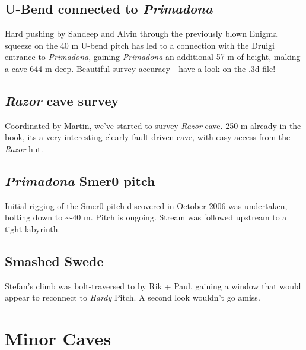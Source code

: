 \hypertarget{u-bend-connected-to-primadona}{%
\subsection{\texorpdfstring{U-Bend connected to
\emph{Primadona}}{U-Bend connected to Primadona}}\label{u-bend-connected-to-primadona}}

Hard pushing by Sandeep and Alvin through the previously blown Enigma
squeeze on the 40 m U-bend pitch has led to a connection with the Druigi
entrance to \emph{Primadona}, gaining \emph{Primadona} an additional 57
m of height, making a cave 644 m deep. Beautiful survey accuracy - have
a look on the .3d file!

\hypertarget{razor-cave-survey}{%
\subsection{\texorpdfstring{\emph{Razor} cave
survey}{Razor cave survey}}\label{razor-cave-survey}}

Coordinated by Martin, we've started to survey \emph{Razor} cave. 250 m
already in the book, its a very interesting clearly fault-driven cave,
with easy access from the \emph{Razor} hut.

\hypertarget{primadona-smer0-pitch}{%
\subsection{\texorpdfstring{\emph{Primadona} Smer0
pitch}{Primadona Smer0 pitch}}\label{primadona-smer0-pitch}}

Initial rigging of the Smer0 pitch discovered in October 2006 was
undertaken, bolting down to \textasciitilde{}-40 m. Pitch is ongoing.
Stream was followed upstream to a tight labyrinth.

\hypertarget{smashed-swede}{%
\subsection{Smashed Swede}\label{smashed-swede}}

Stefan's climb was bolt-traversed to by Rik + Paul, gaining a window
that would appear to reconnect to \emph{Hardy} Pitch. A second look
wouldn't go amiss.

\hypertarget{minor-caves}{%
\section{Minor Caves}\label{minor-caves}}


